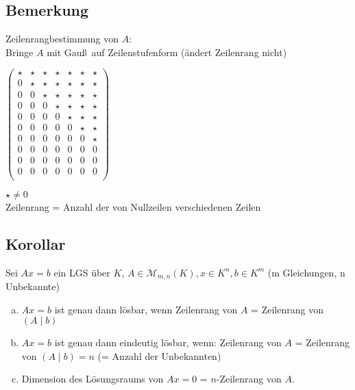 \subsection{Bemerkung}\label{sec:\thesubsection}
Zeilenrangbestimmung von $A$:\\
Bringe $A$ mit Gau\ss\ auf Zeilenstufenform (ändert Zeilenrang nicht)\\
\begin{minipage}{.5\textwidth}
$\begin{pmatrix}
\star&\star&\star&\star&\star&\star&\star\\
0&\star&\star&\star&\star&\star&\star\\
0&0&\star&\star&\star&\star&\star\\
0&0&0&\star&\star&\star&\star\\
0&0&0&0&\star&\star&\star\\
0&0&0&0&0&\star&\star\\
0&0&0&0&0&0&\star\\
0&0&0&0&0&0&0\\
0&0&0&0&0&0&0\\
0&0&0&0&0&0&0\\
\end{pmatrix}$
\end{minipage}%
\begin{minipage}{.5\textwidth}
$\star \ne 0$\\
Zeilenrang = Anzahl der von Nullzeilen verschiedenen Zeilen
\end{minipage}
\subsection{Korollar}\label{sec:\thesubsection}
Sei $Ax = b$ ein LGS über $K$, $A \in \mathcal{M}_{m,n}(K), x \in K^n, b \in K^m$ (m Gleichungen, n Unbekannte)
\begin{enumerate}[a)]
\item $Ax = b$ ist genau dann lösbar, wenn Zeilenrang von $A$ = Zeilenrang von\\ $(A\mid b)$
\item $Ax = b$ ist genau dann eindeutig lösbar, wenn: Zeilenrang von $A$ = Zeilenrang von $(A\mid b) = n$ (= Anzahl der Unbekannten)
\item Dimension des Lösungsraums von $Ax = 0$ = $n$-Zeilenrang von $A$.
\end{enumerate}
